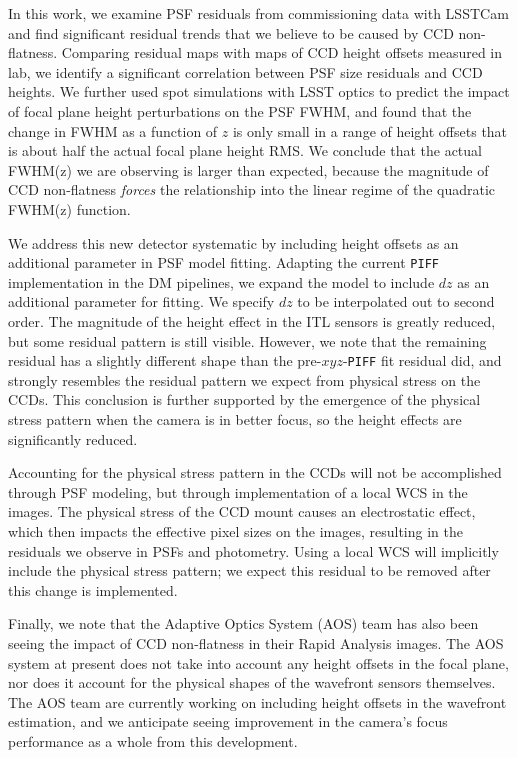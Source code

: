 \documentclass[SE,lsstdraft,authoryear,toc]{lsstdoc}
\begin{document}
In this work, we examine PSF residuals from commissioning data with LSSTCam and find significant residual trends that we believe to be caused by CCD non-flatness.
Comparing residual maps with maps of CCD height offsets measured in lab, we identify a significant correlation between PSF size residuals and CCD heights.
We further used spot simulations with LSST optics to predict the impact of focal plane height perturbations on the PSF FWHM, and found that the change in FWHM as a function of $z$ is only small in a range of height offsets that is about half the actual focal plane height RMS.
We conclude that the actual FWHM(z) we are observing is larger than expected, because the magnitude of CCD non-flatness \textit{forces} the relationship into the linear regime of the quadratic FWHM(z) function.

We address this new detector systematic by including height offsets as an additional parameter in PSF model fitting. 
Adapting the current \texttt{PIFF} implementation in the DM pipelines, we expand the model to include $dz$ as an additional parameter for fitting.
We specify $dz$ to be interpolated out to second order.
The magnitude of the height effect in the ITL sensors is greatly reduced, but some residual pattern is still visible.
However, we note that the remaining residual has a slightly different shape than the pre-$xyz$-\texttt{PIFF} fit residual did, and strongly resembles the residual pattern we expect from physical stress on the CCDs.
This conclusion is further supported by the emergence of the physical stress pattern when the camera is in better focus, so the height effects are significantly reduced.

Accounting for the physical stress pattern in the CCDs will not be accomplished through PSF modeling, but through implementation of a local WCS in the images. 
The physical stress of the CCD mount causes an electrostatic effect, which then impacts the effective pixel sizes on the images, resulting in the residuals we observe in PSFs and photometry.
Using a local WCS will implicitly include the physical stress pattern; we expect this residual to be removed after this change is implemented.

Finally, we note that the Adaptive Optics System (AOS) team has also been seeing the impact of CCD non-flatness in their Rapid Analysis images. 
The AOS system at present does not take into account any height offsets in the focal plane, nor does it account for the physical shapes of the wavefront sensors themselves.
The AOS team are currently working on including height offsets in the wavefront estimation, and we anticipate seeing improvement in the camera's focus performance as a whole from this development.
\end{document}
